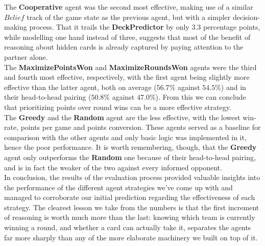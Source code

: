 \documentclass[sigconf]{acmart}
\begin{document}
The \textbf{Cooperative} agent was the second most effective, making use of a similar $Belief$ track of the game state as the previous agent, but with a simpler decision-making process. That it trails the \textbf{DeckPredictor} by only $3.3$ percentage points, while modelling one hand instead of three, suggests that most of the benefit of reasoning about hidden cards is already captured by paying attention to the partner alone.\\

The \textbf{MaximizePointsWon} and \textbf{MaximizeRoundsWon} agents were the third and fourth most effective, respectively, with the first agent being slightly more effective than the latter agent, both on average ($56.7\%$ against $54.5\%$) and in their head-to-head pairing ($50.8\%$ against $47.0\%$). From this we can conclude that prioritizing points over round wins can be a more effective strategy.\\

The \textbf{Greedy} and the \textbf{Random} agent are the less effective, with the lowest win-rate, points per game and points conversion. These agents served as a baseline for comparison with the other agents and only basic logic was implemented in it, hence the poor performance. It is worth remembering, though, that the \textbf{Greedy} agent only outperforms the \textbf{Random} one because of their head-to-head pairing, and is in fact the weaker of the two against every informed opponent.\\

\noindent In conclusion, the results of the evaluation process provided valuable insights into the performance of the different agent strategies we've come up with and managed to corroborate our initial prediction regarding the effectiveness of each strategy. The clearest lesson we take from the numbers is that the first increment of reasoning is worth much more than the last: knowing which team is currently winning a round, and whether a card can actually take it, separates the agents far more sharply than any of the more elaborate machinery we built on top of it.



\end{document}
